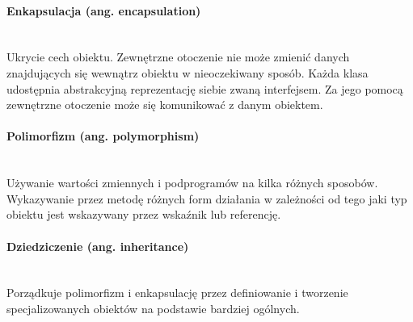 \paragraph{Enkapsulacja (ang. encapsulation)}\mbox{}\\ Ukrycie cech obiektu. Zewnętrzne otoczenie nie może zmienić danych znajdujących się wewnątrz obiektu w nieoczekiwany sposób. Każda klasa udostępnia abstrakcyjną reprezentację siebie zwaną interfejsem. Za jego pomocą zewnętrzne otoczenie może się komunikować z danym obiektem.
\paragraph{Polimorfizm (ang. polymorphism)}\mbox{}\\ Używanie wartości zmiennych i podprogramów na kilka różnych sposobów. Wykazywanie przez metodę różnych form działania w zależności od tego jaki typ obiektu jest wskazywany przez wskaźnik lub referencję.
\paragraph{Dziedziczenie (ang. inheritance)}\mbox{}\\ Porządkuje polimorfizm i enkapsulację przez definiowanie i tworzenie specjalizowanych obiektów na podstawie bardziej ogólnych.

